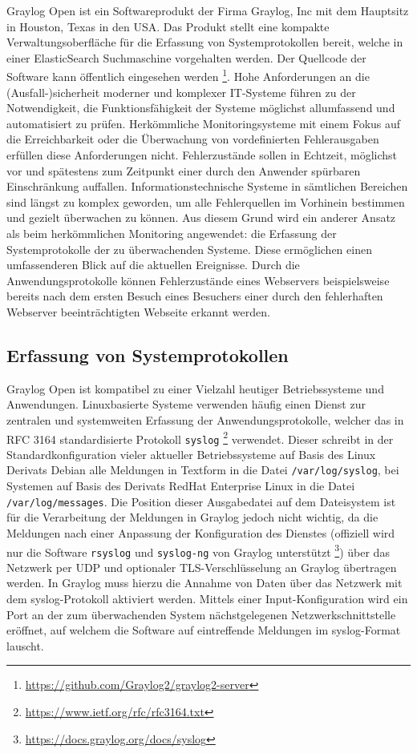 Graylog Open ist ein Softwareprodukt der Firma Graylog, Inc mit dem Hauptsitz in Houston, Texas in den USA. Das Produkt stellt eine kompakte Verwaltungsoberfläche für die Erfassung von Systemprotokollen bereit, welche in einer ElasticSearch Suchmaschine vorgehalten werden. Der Quellcode der Software kann öffentlich eingesehen werden \footnote{\url{https://github.com/Graylog2/graylog2-server}}. Hohe Anforderungen an die (Ausfall-)sicherheit moderner und komplexer IT-Systeme führen zu der Notwendigkeit, die Funktionsfähigkeit der Systeme möglichst allumfassend und automatisiert zu prüfen. Herkömmliche Monitoringsysteme mit einem Fokus auf die Erreichbarkeit oder die Überwachung von vordefinierten Fehlerausgaben erfüllen diese Anforderungen nicht. Fehlerzustände sollen in Echtzeit, möglichst vor und spätestens zum Zeitpunkt einer durch den Anwender spürbaren Einschränkung auffallen. Informationstechnische Systeme in sämtlichen Bereichen sind längst zu komplex geworden, um alle Fehlerquellen im Vorhinein bestimmen und gezielt überwachen zu können. Aus diesem Grund wird ein anderer Ansatz als beim herkömmlichen Monitoring angewendet: die Erfassung der Systemprotokolle der zu überwachenden Systeme. Diese ermöglichen einen umfassenderen Blick auf die aktuellen Ereignisse. Durch die Anwendungsprotokolle können Fehlerzustände eines Webservers beispielsweise bereits nach dem ersten Besuch eines Besuchers einer durch den fehlerhaften Webserver beeinträchtigten Webseite erkannt werden.

\subsection{Erfassung von Systemprotokollen}

Graylog Open ist kompatibel zu einer Vielzahl heutiger Betriebssysteme und Anwendungen. Linuxbasierte Systeme verwenden häufig einen Dienst zur zentralen und systemweiten Erfassung der Anwendungsprotokolle, welcher das in RFC 3164 standardisierte Protokoll \lstinline{syslog} \footnote{\url{https://www.ietf.org/rfc/rfc3164.txt}} verwendet. Dieser schreibt in der Standardkonfiguration vieler aktueller Betriebssysteme auf Basis des Linux Derivats Debian alle Meldungen in Textform in die Datei \lstinline{/var/log/syslog}, bei Systemen auf Basis des Derivats RedHat Enterprise Linux in die Datei \lstinline{/var/log/messages}. Die Position dieser Ausgabedatei auf dem Dateisystem ist für die Verarbeitung der Meldungen in Graylog jedoch nicht wichtig, da die Meldungen nach einer Anpassung der Konfiguration des Dienstes (offiziell wird nur die Software \lstinline{rsyslog} und \lstinline{syslog-ng} von Graylog unterstützt \footnote{\url{https://docs.graylog.org/docs/syslog}}) über das Netzwerk per UDP und optionaler TLS-Verschlüsselung an Graylog übertragen werden. In Graylog muss hierzu die Annahme von Daten über das Netzwerk mit dem syslog-Protokoll aktiviert werden. Mittels einer Input-Konfiguration wird ein Port an der zum überwachenden System nächstgelegenen Netzwerkschnittstelle eröffnet, auf welchem die Software auf eintreffende Meldungen im syslog-Format lauscht.

